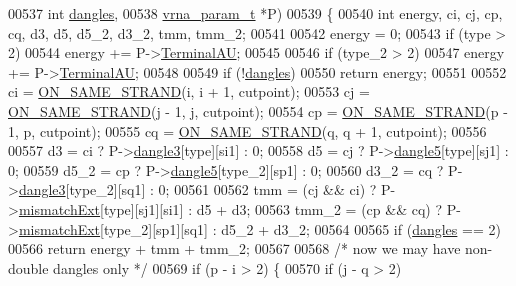 \begin{DoxyCode}
00537              \textcolor{keywordtype}{int}          \mbox{\hyperlink{group__model__details_ga72b511ed1201f7e23ec437e468790d74}{dangles}},
00538              \mbox{\hyperlink{group__energy__parameters_structvrna__param__s}{vrna\_param\_t}} *P)
00539 \{
00540   \textcolor{keywordtype}{int} energy, ci, cj, cp, cq, d3, d5, d5\_2, d3\_2, tmm, tmm\_2;
00541 
00542   energy = 0;
00543   \textcolor{keywordflow}{if} (type > 2)
00544     energy += P->\mbox{\hyperlink{group__energy__parameters_a0ad35507a03ba7f751e82cb375e991dd}{TerminalAU}};
00545 
00546   \textcolor{keywordflow}{if} (type\_2 > 2)
00547     energy += P->\mbox{\hyperlink{group__energy__parameters_a0ad35507a03ba7f751e82cb375e991dd}{TerminalAU}};
00548 
00549   \textcolor{keywordflow}{if} (!\mbox{\hyperlink{group__model__details_ga72b511ed1201f7e23ec437e468790d74}{dangles}})
00550     \textcolor{keywordflow}{return} energy;
00551 
00552   ci  = \mbox{\hyperlink{interior__loops_8h_a6b109d72bf39073254090cf105a17641}{ON\_SAME\_STRAND}}(i, i + 1, cutpoint);
00553   cj  = \mbox{\hyperlink{interior__loops_8h_a6b109d72bf39073254090cf105a17641}{ON\_SAME\_STRAND}}(j - 1, j, cutpoint);
00554   cp  = \mbox{\hyperlink{interior__loops_8h_a6b109d72bf39073254090cf105a17641}{ON\_SAME\_STRAND}}(p - 1, p, cutpoint);
00555   cq  = \mbox{\hyperlink{interior__loops_8h_a6b109d72bf39073254090cf105a17641}{ON\_SAME\_STRAND}}(q, q + 1, cutpoint);
00556 
00557   d3    = ci  ? P->\mbox{\hyperlink{group__energy__parameters_a75c644da73d4d01c86b5f6a1e3af3ae9}{dangle3}}[type][si1]   : 0;
00558   d5    = cj  ? P->\mbox{\hyperlink{group__energy__parameters_ad2534b54836d48b4f549b319766f658f}{dangle5}}[type][sj1]   : 0;
00559   d5\_2  = cp  ? P->\mbox{\hyperlink{group__energy__parameters_ad2534b54836d48b4f549b319766f658f}{dangle5}}[type\_2][sp1] : 0;
00560   d3\_2  = cq  ? P->\mbox{\hyperlink{group__energy__parameters_a75c644da73d4d01c86b5f6a1e3af3ae9}{dangle3}}[type\_2][sq1] : 0;
00561 
00562   tmm   = (cj && ci) ? P->\mbox{\hyperlink{group__energy__parameters_a6122f31447a8cccdd1203c9695ba1e3b}{mismatchExt}}[type][sj1][si1]   : d5 + d3;
00563   tmm\_2 = (cp && cq) ? P->\mbox{\hyperlink{group__energy__parameters_a6122f31447a8cccdd1203c9695ba1e3b}{mismatchExt}}[type\_2][sp1][sq1] : d5\_2 + d3\_2;
00564 
00565   \textcolor{keywordflow}{if} (\mbox{\hyperlink{group__model__details_ga72b511ed1201f7e23ec437e468790d74}{dangles}} == 2)
00566     \textcolor{keywordflow}{return} energy + tmm + tmm\_2;
00567 
00568   \textcolor{comment}{/* now we may have non-double dangles only */}
00569   \textcolor{keywordflow}{if} (p - i > 2) \{
00570     \textcolor{keywordflow}{if} (j - q > 2)

\end{DoxyCode}

